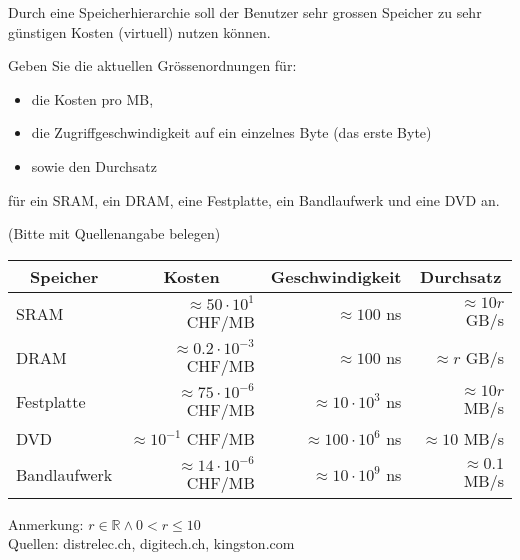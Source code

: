 \pagebreak
\question
Durch eine Speicherhierarchie soll der Benutzer sehr grossen Speicher zu sehr günstigen Kosten (virtuell) nutzen können.

Geben
Sie die aktuellen Grössenordnungen für:
\begin{itemize}
	\item die Kosten pro MB,
	\item die Zugriffgeschwindigkeit auf ein einzelnes Byte (das erste Byte)
	\item sowie den Durchsatz
\end{itemize}
für ein SRAM, ein DRAM, eine Festplatte, ein Bandlaufwerk und eine DVD an.

(Bitte mit Quellenangabe belegen)
\begin{solutionordottedlines}[2cm]
\begin{center}
	\begin{tabular}{lrrr}
		\toprule
		\multicolumn{1}{c}{\textbf{Speicher}} & \multicolumn{1}{c}{\textbf{Kosten}} & \multicolumn{1}{c}{\textbf{Geschwindigkeit}} & \multicolumn{1}{c}{\textbf{Durchsatz}}\\
		\midrule
		SRAM & $\approx 50 \cdot 10^1$ CHF/MB & $\approx 100$ ns & $\approx 10r$ GB/s\\\hline
		DRAM & $\approx 0.2 \cdot 10^{-3}$ CHF/MB & $\approx 100$ ns & $\approx r$ GB/s\\\hline
		Festplatte & $\approx 75 \cdot 10^{-6}$ CHF/MB & $\approx 10 \cdot 10^3$ ns & $\approx 10r$ MB/s\\\hline
		DVD & $\approx 10^{-1} $ CHF/MB & $\approx 100 \cdot 10^6$ ns & $\approx 10$ MB/s\\\hline
		Bandlaufwerk & $\approx 14 \cdot 10^{-6}$ CHF/MB & $\approx 10 \cdot 10^9$ ns & $\approx 0.1$ MB/s\\
		\bottomrule
	\end{tabular}
\end{center}
Anmerkung: $r \in \mathbb{R} \wedge 0 < r \leq 10$\\
Quellen: distrelec.ch, digitech.ch, kingston.com
\end{solutionordottedlines}
